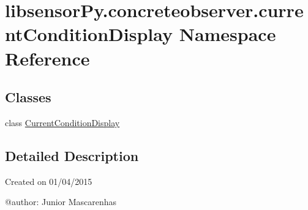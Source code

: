 \hypertarget{namespacelibsensorPy_1_1concreteobserver_1_1currentConditionDisplay}{}\section{libsensor\+Py.\+concreteobserver.\+current\+Condition\+Display Namespace Reference}
\label{namespacelibsensorPy_1_1concreteobserver_1_1currentConditionDisplay}
\subsection*{Classes}
\begin{DoxyCompactItemize}
\item 
class \hyperlink{classlibsensorPy_1_1concreteobserver_1_1currentConditionDisplay_1_1CurrentConditionDisplay}{Current\+Condition\+Display}
\end{DoxyCompactItemize}


\subsection{Detailed Description}
\begin{DoxyVerb}Created on 01/04/2015

@author: Junior Mascarenhas
\end{DoxyVerb}
 